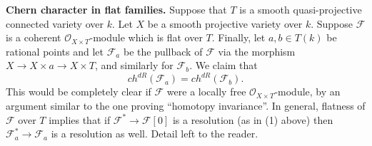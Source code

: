 \medskip\noindent
{\bf Chern character in flat families.} 
Suppose that $T$ is a smooth quasi-projective connected variety over $k$.
Let $X$ be a smooth projective variety over $k$. 
Suppose ${\mathcal F}$ is a coherent ${\mathcal O}_{X\times T}$-module
which is flat over $T$. Finally, let $a,b\in T(k)$ be rational
points and let ${\mathcal F}_a$ be the pullback of ${\mathcal F}$
via the morphism $X \to X\times a \to X\times T$, and
similarly for ${\mathcal F}_b$. We claim that
$$
ch^{dR}({\mathcal F}_a) = ch^{dR}({\mathcal F}_b).
$$
This would be completely clear if ${\mathcal F}$ were a locally
free ${\mathcal O}_{X\times T}$-module, by an argument similar 
to the one proving ``homotopy invariance''. In general,
flatness of ${\mathcal F}$ over $T$ implies that if
${\mathcal F}^* \to {\mathcal F}[0]$ is a resolution (as in (1) above)
then ${\mathcal F}^*_a \to {\mathcal F}_a$ is a resolution as well.
Detail left to the reader.

